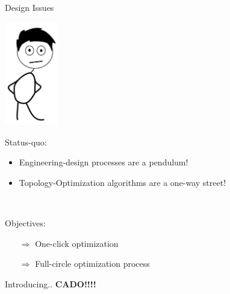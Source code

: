 \begin{frame}{Design Issues}
	
	\includegraphics[width=0.175\textwidth, center]{Pictures/animations/animation_designer_sad}
	
	\begin{multicols}{2}
		\begin{block}{Status-quo:}{
		\begin{itemize}		
			\item Engineering-design processes are a pendulum!
			\item Topology-Optimization algorithms are a one-way street!
		\end{itemize}~\\
		}
		\end{block}
		\columnbreak

		\begin{block}{Objectives:}{
		\begin{itemize}		
			\item[$\Rightarrow$] One-click optimization
		\end{itemize}
		\begin{itemize}		
			\item[$\Rightarrow$] Full-circle optimization process	
		\end{itemize}
		}
		\end{block}
				
		\end{multicols}

\end{frame}	

\begin{frame}{Introducing..}
	\textbf{CADO!!!!}
\end{frame}

